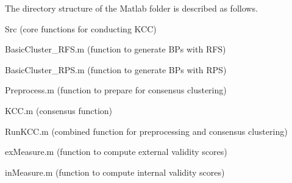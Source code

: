 \documentclass[10pt]{acmtrans2e}
\begin{document}
The directory structure of the \textsf{Matlab} folder is described as follows.
\begin{compactitem}
  \item \textsf{Src} (core functions for conducting KCC)
  \begin{compactitem}
   \item \textsf{BasicCluster\_RFS.m} (function to generate BPs with RFS)
   \item \textsf{BasicCluster\_RPS.m} (function to generate BPs with RPS)
   \item \textsf{Preprocess.m} (function to prepare for consensus clustering)
   \item \textsf{KCC.m} (consensus function)
   \item \textsf{RunKCC.m} (combined function for preprocessing and consensus clustering)
   \item \textsf{exMeasure.m} (function to compute external validity scores)
   \item \textsf{inMeasure.m} (function to compute internal validity scores)


\end{compactitem}
\end{compactitem}
\end{document}
